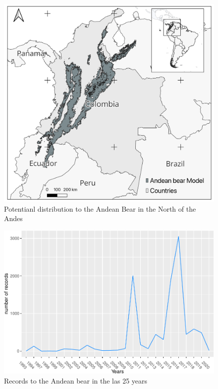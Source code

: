 \documentclass[preprint, 3p,
authoryear]{elsarticle} %
\begin{document}
\begin{figure}

{\centering \includegraphics[width=1\linewidth]{../figures/Figure1} 

}

\caption{Potentianl distribution to the Andean Bear in the North of the Andes}\label{fig:unnamed-chunk-1}
\end{figure}

\begin{figure}
\centering
\includegraphics{manuscript_files/figure-latex/theme_ggplot2-1.pdf}
\caption{Records to the Andean bear in the las 25 years}
\end{figure}
\end{document}
